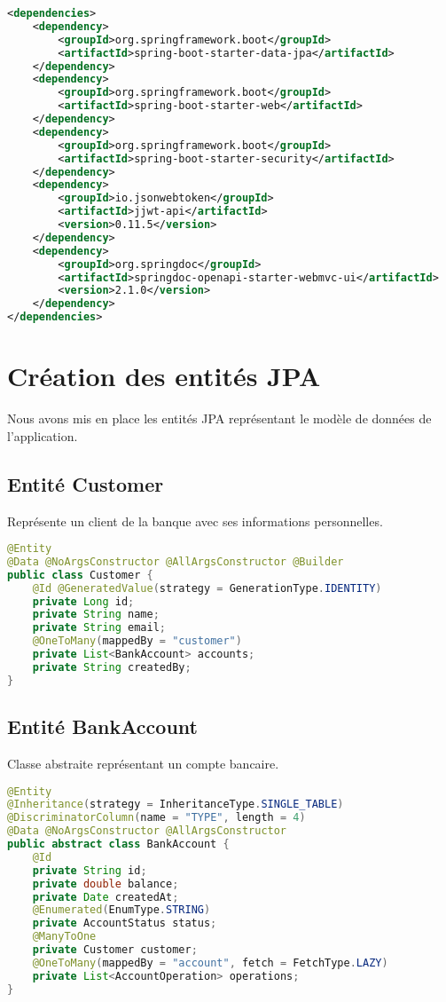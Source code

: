 \documentclass[12pt,a4paper]{report}
\begin{document}
\begin{lstlisting}[language=XML, caption=pom.xml - Dépendances principales]
<dependencies>
    <dependency>
        <groupId>org.springframework.boot</groupId>
        <artifactId>spring-boot-starter-data-jpa</artifactId>
    </dependency>
    <dependency>
        <groupId>org.springframework.boot</groupId>
        <artifactId>spring-boot-starter-web</artifactId>
    </dependency>
    <dependency>
        <groupId>org.springframework.boot</groupId>
        <artifactId>spring-boot-starter-security</artifactId>
    </dependency>
    <dependency>
        <groupId>io.jsonwebtoken</groupId>
        <artifactId>jjwt-api</artifactId>
        <version>0.11.5</version>
    </dependency>
    <dependency>
        <groupId>org.springdoc</groupId>
        <artifactId>springdoc-openapi-starter-webmvc-ui</artifactId>
        <version>2.1.0</version>
    </dependency>
</dependencies>
\end{lstlisting}

\section{Création des entités JPA}
Nous avons mis en place les entités JPA représentant le modèle de données de l'application.

\subsection{Entité Customer}
Représente un client de la banque avec ses informations personnelles.

\begin{lstlisting}[language=Java, caption=Customer.java]
@Entity
@Data @NoArgsConstructor @AllArgsConstructor @Builder
public class Customer {
    @Id @GeneratedValue(strategy = GenerationType.IDENTITY)
    private Long id;
    private String name;
    private String email;
    @OneToMany(mappedBy = "customer")
    private List<BankAccount> accounts;
    private String createdBy;
}
\end{lstlisting}

\subsection{Entité BankAccount}
Classe abstraite représentant un compte bancaire.

\begin{lstlisting}[language=Java, caption=BankAccount.java]
@Entity
@Inheritance(strategy = InheritanceType.SINGLE_TABLE)
@DiscriminatorColumn(name = "TYPE", length = 4)
@Data @NoArgsConstructor @AllArgsConstructor
public abstract class BankAccount {
    @Id
    private String id;
    private double balance;
    private Date createdAt;
    @Enumerated(EnumType.STRING)
    private AccountStatus status;
    @ManyToOne
    private Customer customer;
    @OneToMany(mappedBy = "account", fetch = FetchType.LAZY)
    private List<AccountOperation> operations;
}
\end{lstlisting}
\end{document}

